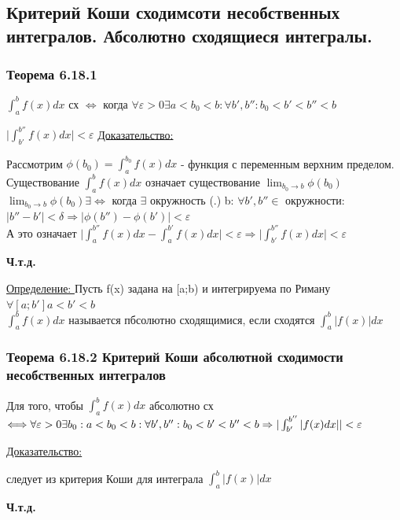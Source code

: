 \documentclass[12pt]{article}
\begin{document}
    \subsection{Критерий Коши сходимсоти несобственных интегралов. Абсолютно сходящиеся интегралы.}
    \subsubsection*{Теорема 6.18.1}\label{th:6.18.1}
    $\int_{a}^{b}f(x)dx$ сх $\Longleftrightarrow$ когда $\forall \varepsilon > 0 \exists a<b_0<b:\forall b',b'':b_0<b'<b''<b$\par\noindent
    $\Big| \int_{b'}^{b''}f(x)dx \Big| < \varepsilon$
    \underline{Доказательство:}
    \begin{adjustwidth}{1.5em}{1.5em}
        Рассмотрим $\phi(b_0)=\int_{a}^{b_0}f(x)dx$ - функция с переменным верхним пределом.\\
        Существование $\int_{a}^{b}f(x)dx$ означает существование $\lim_{b_0 \to b}\phi(b_0)$\\
        $\lim_{b_0 \to b}\phi(b_0) \exists \Longleftrightarrow$ когда $\exists$ окружность (.) b: $\forall b',b'' \in $ окружности: $|b''-b'|<\delta \Rightarrow |\phi(b'')-\phi(b')|<\varepsilon$\\
        А это означает $\Big| \int_{a}^{b''}f(x)dx - \int_{a}^{b'}f(x)dx \Big| < \varepsilon \Rightarrow \Big| \int_{b'}^{b''} f(x)dx \Big| < \varepsilon$
    \end{adjustwidth}
    \begin{center}
        \textbf{Ч.т.д.}
    \end{center}
    \underline{Определение: } Пусть f(x) задана на [a;b) и интегрируема по Риману $\forall [a;b'] a<b'<b$\\
    $\int_{a}^{b}f(x)dx$ называется пбсолютно сходящимися, если сходятся $\int_{a}^{b}|f(x)|dx$
    \subsubsection*{Теорема 6.18.2 Критерий Коши абсолютной сходимости несобственных интегралов}\label{th:6.18.2}
    Для того, чтобы $\int_{a}^{b}f(x)dx$ абсолютно сх $\Longleftrightarrow \forall \varepsilon >0 \exists b_0:a<b_0<b: \forall b',b'':\\b_0<b'<b''<b \Rightarrow |\int_{b'}^{b''}|f(x)dx|| < \varepsilon$\par\noindent
    \underline{Доказательство:}
    \begin{adjustwidth}{1.5em}{1.5em}
        следует из критерия Коши для интеграла $\int_{a}^{b}|f(x)|dx$
    \end{adjustwidth}
    \begin{center}
        \textbf{Ч.т.д.}
    \end{center}
\end{document}
